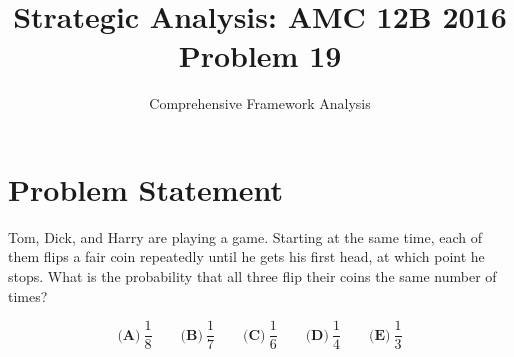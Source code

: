 \documentclass[11pt]{article}
\title{\textbf{Strategic Analysis: AMC 12B 2016 Problem 19}}
\author{Comprehensive Framework Analysis}
\date{}
\begin{document}
\maketitle

\section*{Problem Statement}

Tom, Dick, and Harry are playing a game. Starting at the same time, each of them flips a fair coin repeatedly until he gets his first head, at which point he stops. What is the probability that all three flip their coins the same number of times?

\[\textbf{(A)}\ \frac{1}{8} \qquad \textbf{(B)}\ \frac{1}{7} \qquad \textbf{(C)}\ \frac{1}{6} \qquad \textbf{(D)}\ \frac{1}{4} \qquad \textbf{(E)}\ \frac{1}{3}\]

\vspace{1em}
\end{document}
